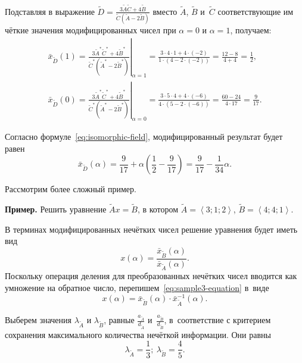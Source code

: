 Подставляя в выражение $\displaystyle \tilde{D}=\frac{3\tilde{A}\tilde{C}+4\tilde{B}}{\tilde{C}\left( \tilde{A}-2\tilde{B} \right)}$ вместо $\tilde A$, $\tilde B$ и~$\tilde C$ соответствующие им чёткие значения модифицированных чисел при $\alpha=0$ и $\alpha=1$, получаем:
\begin{gather*}
  \bar{x}_{\tilde D}\left( 1 \right)={{\left. \frac{3{{\tilde A}^{*}}{{\tilde C}^{*}}+4{{\tilde B}^{*}}}{{{\tilde C}^{*}}\left( {{\tilde A}^{*}}-2{{\tilde B}^{*}} \right)} \right|}_{\alpha =1}}=\frac{3\cdot 4\cdot 1+4\cdot \left( -2 \right)}{1\cdot \left( 4-2\cdot \left( -2 \right) \right)}=\frac{12-8}{4+4}=\frac{1}{2}, \\
  {{\bar{x}}_{\tilde D}}\left( 0 \right)={{\left. \frac{3{{\tilde A}^{*}}{{\tilde C}^{*}}+4{{\tilde B}^{*}}}{{{\tilde C}^{*}}\left( {{\tilde A}^{*}}-2{{\tilde B}^{*}} \right)} \right|}_{\alpha =0}}=\frac{3\cdot 5\cdot 4+4\cdot \left( -6 \right)}{4\cdot \left( 5-2\cdot \left( -6 \right) \right)}=\frac{60-24}{4\cdot 17}=\frac{9}{17}.
\end{gather*}

Согласно формуле~\eqref{eq:isomorphic-field}, модифицированный результат будет равен
\begin{equation*}
  \bar{x}_{\tilde D}\left( \alpha \right)=\frac{9}{17}+\alpha \left(\frac{1}{2}-\frac{9}{17} \right)=\frac{9}{17}-\frac{1}{34}\alpha.
\end{equation*}
	
Рассмотрим более сложный пример. 

\textbf{Пример.} Решить уравнение $\tilde{A}x=\tilde{B}$, в котором $\tilde{A}=\left\langle 3;1;2 \right\rangle $, $\tilde{B}=\left\langle 4;4;1 \right\rangle $.

В терминах модифицированных нечётких чисел решение уравнения будет иметь вид
\begin{equation}
\label{eq:sample3-equation}
  x\left( \alpha  \right)=\frac{\bar{x}_{\tilde B}\left( \alpha  \right)}{\bar{x}_{\tilde A}\left(\alpha \right)}.
\end{equation}
Поскольку операция деления для преобразованных нечётких чисел вводится как умножение на обратное число, перепишем~\eqref{eq:sample3-equation} в~виде
\begin{equation}
\label{eq:sample3-equation-modified}
  x\left( \alpha  \right)=\bar x_{\tilde B}\left( \alpha  \right)\cdot \bar{x}_{\tilde A}^{-1}\left( \alpha  \right).
\end{equation}

Выберем значения $\lambda_{\tilde A}$ и $\lambda_{\tilde B}$, равные $\displaystyle \frac{a_{\tilde A}}{d_{\tilde A}}$ и~$\displaystyle \frac{a_{\tilde B}}{d_{\tilde B}}$, в~соответствие с критерием сохранения максимального количества нечёткой информации. Они равны
\begin{equation}
\label{eq:sample3-opt-lambda}
  {{\lambda }_{\tilde A}}=\frac{1}{3};\ {{\lambda }_{\tilde B}}=\frac{4}{5}.
\end{equation}

